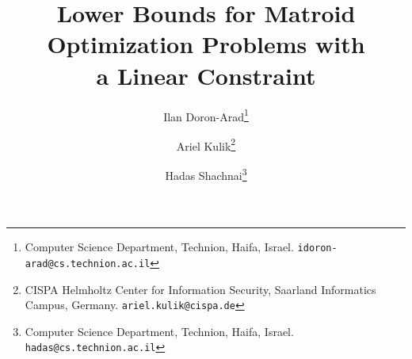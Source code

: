 \documentclass[11pt,letter]{article}
\begin{document}
	
	
	
		\title{
			  Lower Bounds for Matroid Optimization Problems with \\ a Linear Constraint
		}
		
		\author{Ilan Doron-Arad\thanks{Computer Science Department, 
				Technion, Haifa, Israel. \texttt{idoron-arad@cs.technion.ac.il}}
			\and
			Ariel Kulik\thanks{CISPA Helmholtz Center for Information Security, Saarland Informatics Campus, Germany. \texttt{ariel.kulik@cispa.de}} 
			\and
			Hadas Shachnai\thanks{Computer Science Department, 
				Technion, Haifa, Israel. \texttt{hadas@cs.technion.ac.il}}
		}
%				
		\maketitle
		\thispagestyle{empty}
		
\end{document}
